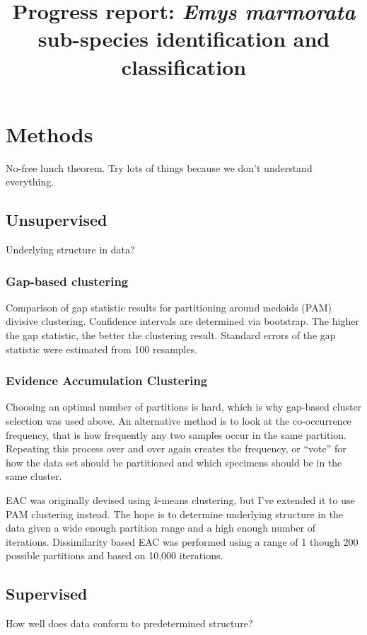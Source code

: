 \documentclass{article}\usepackage{graphicx, color}
\title{Progress report: \textit{Emys marmorata} sub-species identification and classification}
\begin{document}
\maketitle


\section{Methods}
No-free lunch theorem. Try lots of things because we don't understand everything.

\subsection{Unsupervised}
Underlying structure in data?

\subsubsection{Gap-based clustering}
Comparison of gap statistic results for partitioning around medoids (PAM) divisive clustering. Confidence intervals are determined via bootstrap. The higher the gap statistic, the better the clustering result. Standard errors of the gap statistic were estimated from 100 resamples.


\subsubsection{Evidence Accumulation Clustering}
Choosing an optimal number of partitions is hard, which is why gap-based cluster selection was used above. An alternative method is to look at the co-occurrence frequency, that is how frequently any two samples occur in the same partition. Repeating this process over and over again creates the frequency, or ``vote'' for how the data set should be partitioned and  which specimens should be in the same cluster.

EAC was originally devised using \textit{k}-means clustering, but I've extended it to use PAM clustering instead. The hope is to determine underlying structure in the data given a wide enough partition range and a high enough number of iterations. Dissimilarity based EAC was performed using a range of 1 though 200 possible partitions and based on 10,000 iterations.

\subsection{Supervised}
How well does data conform to predetermined structure?
\end{document}
